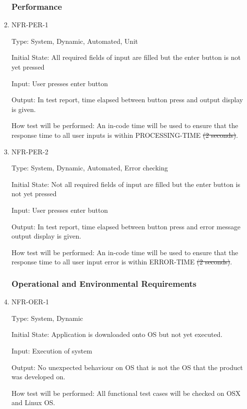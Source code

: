 \documentclass[12pt, titlepage]{article}
\begin{document}
\begin{enumerate}
\subsubsection{Performance}

\item{NFR-PER-1\\}

Type: System, Dynamic, Automated, Unit

Initial State: All required fields of input are filled but the enter button is not yet pressed

Input: User presses enter button

Output: In test report, time elapsed between button press and output display is given.

How test will be performed: An in-code time will be used to ensure that the response time to all user inputs is within PROCESSING-TIME \sout{(2 seconds)}.

\item{NFR-PER-2\\}

Type: System, Dynamic, Automated, Error checking

Initial State: Not all required fields of input are filled but the enter button is not yet pressed

Input: User presses enter button

Output: In test report, time elapsed between button press and error message output display is given.

How test will be performed: An in-code time will be used to ensure that the response time to all user input error is within ERROR-TIME \sout{(2 seconds)}.

\subsubsection{Operational and Environmental Requirements}

\item{NFR-OER-1\\}

Type: System, Dynamic

Initial State: Application is downloaded onto OS but not yet executed.

Input: Execution of system

Output: No unexpected behaviour on OS that is not the OS that the product was developed on.

How test will be performed: All functional test cases will be checked on OSX and Linux OS.


\end{enumerate}
\end{document}
